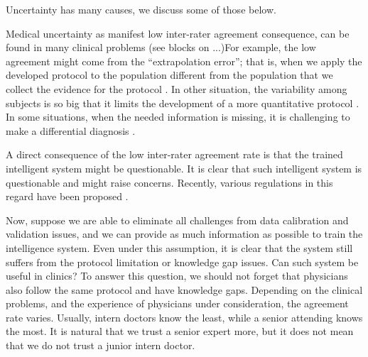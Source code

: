 \documentclass[11pt]{article}
\begin{document}
Uncertainty has many causes, we discuss some of those below.

  Medical uncertainty as manifest low inter-rater agreement
  consequence, can be found in many clinical problems (see blocks on
  ...)For example, the low agreement might come from the
  ``extrapolation error''; that is, when we apply the developed
  protocol to the population different from the population that we
  collect the evidence for the protocol \cite{brosnan2015modest}.  In
  other situation, the variability among subjects is so big that it
  limits the development of a more quantitative protocol
  \cite{venhola2003interobserver}. In some situations, when the needed
  information is missing, it is challenging to make a differential
  diagnosis \cite{moncada2011reading}.

  A direct consequence of the low inter-rater agreement rate is that the trained intelligent system might be questionable. 
%  
It is clear that such intelligent system is questionable and might raise concerns. Recently, various regulations in this regard have been proposed \cite{price2014black,ford2016privacy}.


Now, suppose we are able to eliminate all challenges from data
calibration and validation issues, and we can provide as much
information as possible to train the intelligence system. Even under
this assumption, it is clear that the system still suffers from the
protocol limitation or knowledge gap issues. Can such system be useful
in clinics? To answer this question, we should not forget that
physicians also follow the same protocol and have knowledge
gaps. Depending on the clinical problems, and the experience of
physicians under consideration, the agreement rate varies. Usually,
intern doctors know the least, while a senior attending knows the
most. It is natural that we trust a senior expert more, but it does
not mean that we do not trust a junior intern doctor.
\end{document}
